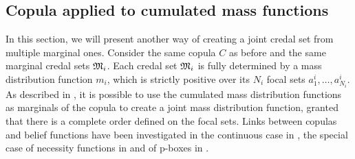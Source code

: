 \subsection{Copula applied to cumulated mass functions}\label{sec:joint_mass}
In this section, we will present another way of creating a joint credal set from multiple marginal ones. Consider the same copula $C$ as before and the same marginal credal sets ${\mathfrak{M}}_i$. Each credal set ${\mathfrak{M}}_i$ is fully determined by a mass distribution function $m_i$, which is strictly positive over its $N_i$ focal sets $a^i_1, \dots, a^i_{N_i}$. As described in \cite{ferson_dependence_2004}, it is possible to use the cumulated mass distribution functions as marginals of the copula to create a joint mass distribution function, granted that there is a complete order defined on the focal sets. Links between copulas and belief functions have been investigated in the continuous case in \cite{schmelzer_joint_2015, schmelzer_multivariate_2019}, the special case of necessity functions in \cite{schmelzer_sklars_2015} and of p-boxes in \cite{schmelzer_random_2023}.

